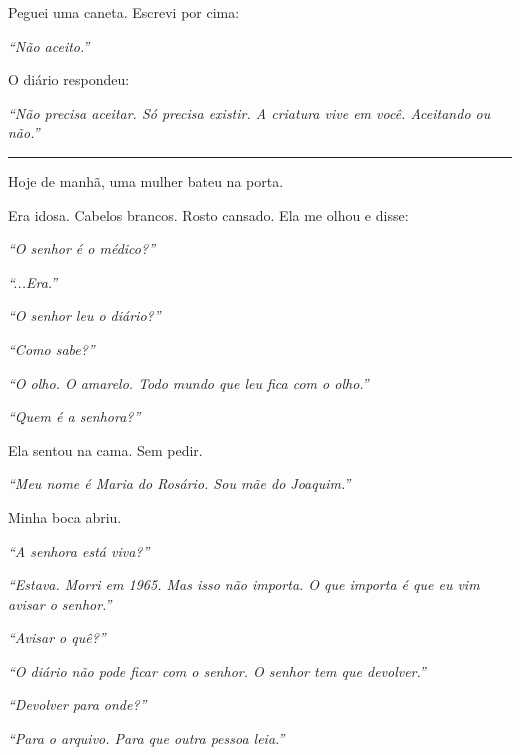 \noindent Peguei uma caneta. Escrevi por cima:

\noindent \textit{\textquotedblleft{}Não aceito.\textquotedblright{}}

\noindent O diário respondeu:

\noindent \textit{\textquotedblleft{}Não precisa aceitar. Só precisa existir. A criatura vive em você. Aceitando ou não.\textquotedblright{}}

\vspace{0.5em}\noindent\rule{\textwidth}{0.5pt}\vspace{0.5em}

\noindent Hoje de manhã, uma mulher bateu na porta.

\noindent Era idosa. Cabelos brancos. Rosto cansado. Ela me olhou e disse:

\noindent \textit{\textquotedblleft{}O senhor é o médico?\textquotedblright{}}

\noindent \textit{\textquotedblleft{}...Era.\textquotedblright{}}

\noindent \textit{\textquotedblleft{}O senhor leu o diário?\textquotedblright{}}

\noindent \textit{\textquotedblleft{}Como sabe?\textquotedblright{}}

\noindent \textit{\textquotedblleft{}O olho. O amarelo. Todo mundo que leu fica com o olho.\textquotedblright{}}

\noindent \textit{\textquotedblleft{}Quem é a senhora?\textquotedblright{}}

\noindent Ela sentou na cama. Sem pedir.

\noindent \textit{\textquotedblleft{}Meu nome é Maria do Rosário. Sou mãe do Joaquim.\textquotedblright{}}

\noindent Minha boca abriu.

\noindent \textit{\textquotedblleft{}A senhora está viva?\textquotedblright{}}

\noindent \textit{\textquotedblleft{}Estava. Morri em 1965. Mas isso não importa. O que importa é que eu vim avisar o senhor.\textquotedblright{}}

\noindent \textit{\textquotedblleft{}Avisar o quê?\textquotedblright{}}

\noindent \textit{\textquotedblleft{}O diário não pode ficar com o senhor. O senhor tem que devolver.\textquotedblright{}}

\noindent \textit{\textquotedblleft{}Devolver para onde?\textquotedblright{}}

\noindent \textit{\textquotedblleft{}Para o arquivo. Para que outra pessoa leia.\textquotedblright{}}

